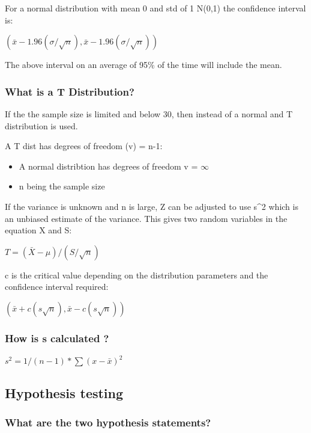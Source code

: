 \documentclass[
]{article}
\providecommand{\tightlist}{%
  \setlength{\itemsep}{0pt}\setlength{\parskip}{0pt}}
\begin{document}
For a normal distribution with mean 0 and std of 1 N(0,1) the confidence
interval is:

\((\bar{x} - 1.96 (\sigma/\sqrt{n}),\bar{x} - 1.96 (\sigma/\sqrt{n}))\)

The above interval on an average of 95\% of the time will include the
mean.

\hypertarget{what-is-a-t-distribution}{%
\subsubsection{What is a T
Distribution?}\label{what-is-a-t-distribution}}

If the the sample size is limited and below 30, then instead of a normal
and T distribution is used.

A T dist has degrees of freedom (v) = n-1:

\begin{itemize}
\tightlist
\item
  A normal distribtion has degrees of freedom v = \(\infty\)
\item
  n being the sample size
\end{itemize}

If the variance is unknown and n is large, Z can be adjusted to use
s\^{}2 which is an unbiased estimate of the variance. This gives two
random variables in the equation X and S:

\(T = (\bar{X} - \mu)/ (S/\sqrt{n})\)

c is the critical value depending on the distribution parameters and the
confidence interval required:

\((\bar{x} + c(s\sqrt{n}),\bar{x} - c(s\sqrt{n}))\)

\hypertarget{how-is-s-calculated}{%
\subsubsection{How is s calculated ?}\label{how-is-s-calculated}}

\(s^2 = 1/(n-1) * \sum(x-\bar{x})^2\)

\hypertarget{hypothesis-testing}{%
\subsection{Hypothesis testing}\label{hypothesis-testing}}

\hypertarget{what-are-the-two-hypothesis-statements}{%
\subsubsection{What are the two hypothesis
statements?}\label{what-are-the-two-hypothesis-statements}}
\end{document}

